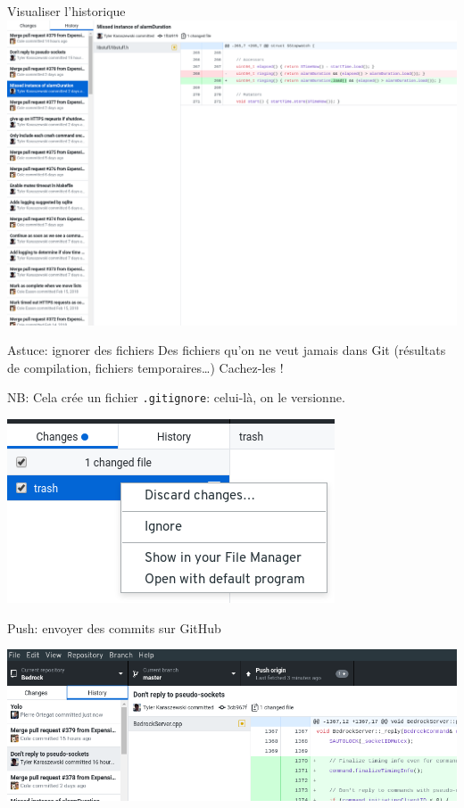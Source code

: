 \documentclass{beamer}
\begin{document}
\begin{frame}{Visualiser l'historique}
    \includegraphics[width=.9\textwidth]{img/github_desktop/historique.png}
\end{frame}

\begin{frame}{Astuce: ignorer des fichiers}
    Des fichiers qu'on ne veut jamais dans Git (résultats de compilation,
    fichiers temporaires\dots) Cachez-les !

    NB: Cela crée un fichier \texttt{.gitignore}: celui-là, on le versionne.
    \begin{center}
        \includegraphics[width=.5\textwidth]{img/github_desktop/ignore.png}
    \end{center}
\end{frame}

\begin{frame}{Push: envoyer des commits sur GitHub}
    \begin{center}
        \includegraphics[width=\textwidth]{img/github_desktop/push_2.png}
    \end{center}
\end{frame}
\end{document}
